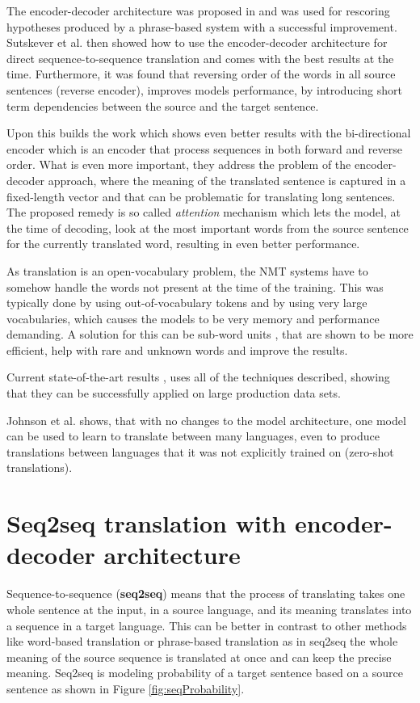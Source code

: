 \documentclass{ExcelAtFIT}
\begin{document}
The encoder-decoder architecture was proposed in \cite{encoderDecoder} and was used for rescoring hypotheses produced by a phrase-based system with a successful improvement. Sutskever et al. \cite{seq2seq} then showed how to use the encoder-decoder architecture for direct sequence-to-sequence translation and comes with the best results at the time. Furthermore, it was found that reversing order of the words in all source sentences (reverse encoder), improves models performance, by introducing short term dependencies between the source and the target sentence.

Upon this builds the work \cite{attention} which shows even better results with the bi-directional encoder which is an encoder that process sequences in both forward and reverse order. What is even more important, they address the problem of the encoder-decoder approach, where the meaning of the translated sentence is captured in a fixed-length vector and that can be problematic for translating long sentences. The proposed remedy is so called \emph{attention} mechanism which lets the model, at the time of decoding, look at the most important words from the source sentence for the currently translated word, resulting in even better performance.

As translation is an open-vocabulary problem, the NMT systems have to somehow handle the words not present at the time of the training. This was typically done by using out-of-vocabulary tokens and by using very large vocabularies, which causes the models to be very memory and performance demanding. A solution for this can be sub-word units \cite{mikolovSubwords, subwords}, that are shown to be more efficient, help with rare and unknown words and improve the results.

Current state-of-the-art results \cite{googleBridgingGap,googleAttention}, uses all of the techniques described, showing that they can be successfully applied on large production data sets.

Johnson et al. \cite{googleMultiLingual} shows, that with no changes to the model architecture, one model can be used to learn to translate between many languages, even to produce translations between languages that it was not explicitly trained on (zero-shot translations).

\section{Seq2seq translation with encoder-decoder architecture}
Sequence-to-sequence (\textbf{seq2seq}) means that the process of translating takes one whole sentence at the input, in a source language, and its meaning translates into a sequence in a target language. This can be better in contrast to other methods like word-based translation or phrase-based translation as in seq2seq the whole meaning of the source sequence is translated at once and can keep the precise meaning. Seq2seq is modeling probability of a target sentence based on a source sentence as shown in Figure \ref{fig:seqProbability}.
\end{document}
